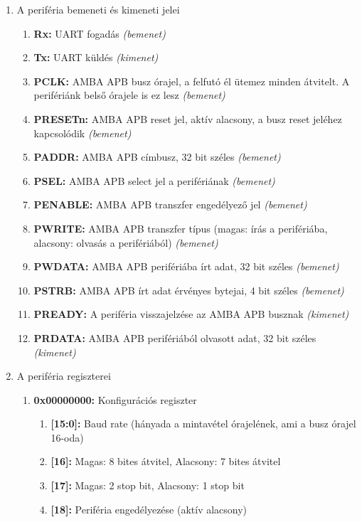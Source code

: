 \begin{enumerate}
\item A periféria bemeneti és kimeneti jelei
\begin{enumerate}
\item \textbf{Rx:} UART fogadás \textit{(bemenet)}
\item \textbf{Tx:} UART küldés \textit{(kimenet)}
\item \textbf{PCLK:} AMBA APB busz órajel, a felfutó él ütemez minden átvitelt. A perifériánk belső órajele is ez lesz \textit{(bemenet)}
\item \textbf{PRESETn:} AMBA APB reset jel, aktív alacsony, a busz reset jeléhez kapcsolódik \textit{(bemenet)}
 \item \textbf{PADDR:} AMBA APB címbusz, 32 bit széles \textit{(bemenet)}
\item \textbf{PSEL:} AMBA APB select jel a perifériának \textit{(bemenet)}
\item \textbf{PENABLE:} AMBA APB transzfer engedélyező jel \textit{(bemenet)}
\item \textbf{PWRITE:} AMBA APB transzfer típus (magas: írás a perifériába, alacsony: olvasás a perifériából) \textit{(bemenet)}
\item \textbf{PWDATA:} AMBA APB perifériába írt adat, 32 bit széles \textit{(bemenet)}
\item \textbf{PSTRB:} AMBA APB írt adat érvényes bytejai, 4 bit széles \textit{(bemenet)}

\item \textbf{PREADY:} A periféria visszajelzése az AMBA APB busznak \textit{(kimenet)}
\item \textbf{PRDATA:} AMBA APB perifériából olvasott adat, 32 bit széles \textit{(kimenet)}

\end{enumerate}

\item A periféria regiszterei
\begin{enumerate}
\item \textbf{0x00000000:} Konfigurációs regiszter
\begin{enumerate}
\item \textbf{[15:0]:} Baud rate (hányada a mintavétel órajelének, ami a busz órajel 16-oda)
\item \textbf{[16]:} Magas: 8 bites átvitel, Alacsony: 7 bites átvitel
\item \textbf{[17]:} Magas: 2 stop bit, Alacsony: 1 stop bit
\item \textbf{[18]:} Periféria engedélyezése (aktív alacsony)


\end{enumerate}
\end{enumerate}
\end{enumerate}
